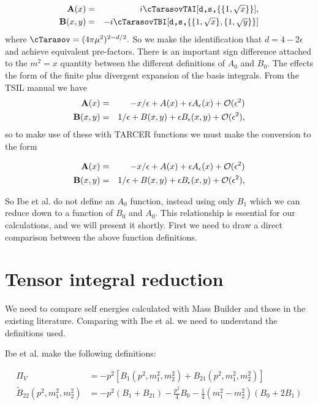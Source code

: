 \documentclass[11pt]{article}
\newcommand{\mb}{\textsf{Mass Builder} }
\newcommand{\tsil}{\textsf{TSIL} }
\newcommand{\tarcer}{\textsf{TARCER} }
\begin{document}
\begin{eqnarray}
{\bf A}(x) &=& i \cTarasov \mbox{{\tt TAI$[$d,s,$\{\{1,\sqrt{x}\}\}]$}},
\\
{\bf B}(x,y) &=& -i \cTarasov \mbox{{\tt TBI$[$d,s,$\{%
\{1,\sqrt{x}\},\{1,\sqrt{y}\}\}]$}} 
\end{eqnarray}
where 
$
\cTarasov = (4 \pi \mu^2)^{2-d/2}.
$
So we make the identification that $d=4-2\epsilon$ and achieve equivalent pre-factors.  There is an important sign difference attached to the $m^2=x$ quantity between the different definitions of $A_0$ and $B_0$.  The effects the form of the finite plus divergent expansion of the basis integrals.  From the \tsil manual we have
\begin{eqnarray}
{\bf A}(x) &=& -x/\epsilon + A(x) + \epsilon A_\epsilon(x) + 
{\cal O}(\epsilon^2) 
\\
{\bf B}(x,y) &=& 1/\epsilon + B(x,y) + \epsilon B_\epsilon(x,y) 
+ {\cal O}(\epsilon^2) ,
\end{eqnarray}
so to make use of these with \tarcer functions we must make the conversion to the form

\begin{eqnarray}
{\bf A}(x) &=& -x/\epsilon + A(x) + \epsilon A_\epsilon(x) + 
{\cal O}(\epsilon^2) 
\\
{\bf B}(x,y) &=& 1/\epsilon + B(x,y) + \epsilon B_\epsilon(x,y) 
+ {\cal O}(\epsilon^2) ,
\end{eqnarray}


So Ibe et al. do not define an $A_0$ function, instead using only $B_1$ which we can reduce down to a function of $B_0$ and $A_0$.  This relationship is essential for our calculations, and we will present it shortly.  First we need to draw a direct comparison between the above function definitions.


\section{Tensor integral reduction}\label{app:reduction}

We need to compare self energies calculated with \mb and those in the existing literature.  Comparing with Ibe et al. we need to understand the definitions used.

Ibe et al. make the following definitions:	

\begin{align}
\Pi_V &= -p^2 \left[ B_1(p^2,m_1^2,m_2^2)+B_{21}(p^2,m_1^2,m_2^2)\right]\\
\tilde{B}_{22}(p^2,m_1^2,m_2^2)&= -p^2(B_1+B_{21})-\frac{p^2}{4}B_0-\frac{1}{4}(m_1^2-m_2^2)(B_0+2B_1)
\end{align}
\end{document}
